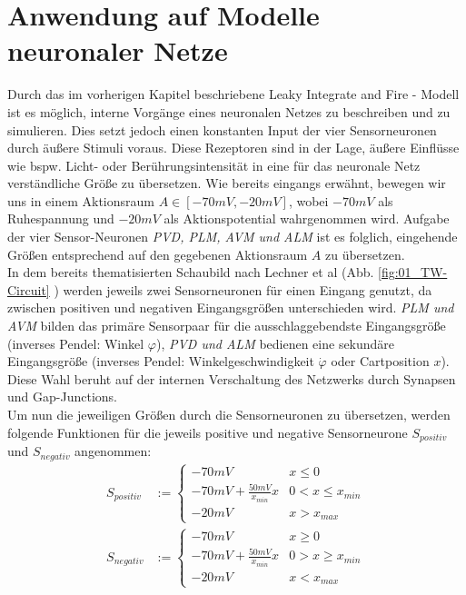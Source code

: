 \section{Anwendung auf Modelle neuronaler Netze}
\label{sec:lif_neuro}
	Durch das im vorherigen Kapitel beschriebene Leaky Integrate and Fire - Modell ist es möglich, interne Vorgänge eines neuronalen Netzes zu beschreiben und zu simulieren. Dies setzt jedoch einen konstanten Input der vier Sensorneuronen durch äußere Stimuli voraus. Diese Rezeptoren sind in der Lage, äußere Einflüsse wie bspw. Licht- oder Berührungsintensität in eine für das neuronale Netz verständliche Größe zu übersetzen. Wie bereits eingangs erwähnt, bewegen wir uns in einem Aktionsraum $A\in[-70mV, -20mV]$, wobei $-70mV$ als Ruhespannung und $-20mV$ als Aktionspotential wahrgenommen wird. Aufgabe der vier Sensor-Neuronen \textit{PVD, PLM, AVM und ALM} ist es folglich, eingehende Größen entsprechend auf den gegebenen Aktionsraum $A$ zu übersetzen.\\
	In dem bereits thematisierten Schaubild nach Lechner et al (Abb. \ref{fig:01_TW-Circuit} \cite{WormLevelRL}) werden jeweils zwei Sensorneuronen für einen Eingang genutzt, da zwischen positiven und negativen Eingangsgrößen unterschieden wird. \textit{PLM und AVM} bilden das primäre Sensorpaar für die ausschlaggebendste Eingangsgröße (inverses Pendel: Winkel $\varphi$), \textit{PVD und ALM} bedienen eine sekundäre Eingangsgröße (inverses Pendel: Winkelgeschwindigkeit $\dot{\varphi}$ oder Cartposition $x$). Diese Wahl beruht auf der internen Verschaltung des Netzwerks durch Synapsen und Gap-Junctions.\\
	Um nun die jeweiligen Größen durch die Sensorneuronen zu übersetzen, werden folgende Funktionen für die jeweils positive und negative Sensorneurone $S_{positiv}$ und $S_{negativ}$ angenommen:
	\begin{align}
		\label{eq:sensor_translation_p}
		S_{positiv} &:= \begin{cases}-70mV & x\leq 0\\-70mV + \frac{50mV}{x_{min}}x & 0 < x \leq x_{min} \\-20mV & x > x_{max}  \end{cases}\\
		\label{eq:sensor_translation_n}
		S_{negativ} &:= \begin{cases}-70mV & x\geq 0\\-70mV + \frac{50mV}{x_{min}}x & 0 > x \geq x_{min} \\-20mV & x < x_{max}  \end{cases}
	\end{align}
